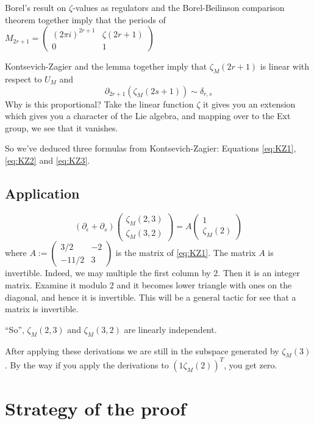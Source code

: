 Borel's result on $\zeta$-values as regulators and the Borel-Beilinson comparison theorem together imply that the periods of $M_{2r+1} = \left( \begin{array}{cc}
(2\pi i)^{2r+1} & \zeta(2r+1) \\
0 & 1
\end{array} \right)$

Kontsevich-Zagier and the lemma together imply that $\zeta_M(2r+1)$ is linear with respect to $U_M$ and
\[\label{eq:KZ3}
\partial_{2r+1}(\zeta_M(2s+1)) \sim \delta_{r,s}
\]
Why is this proportional? Take the linear function $\zeta$ it gives you an extension which gives you a character of the Lie algebra, and mapping over to the Ext group, we see that it vanishes.

So we've deduced three formulas from Kontsevich-Zagier: Equations \ref{eq:KZ1}, \ref{eq:KZ2} and \ref{eq:KZ3}.



\subsection{Application}
\[
(\partial_{\epsilon} + \partial_s)\left( \begin{array}{cc} \zeta_M(2,3) \\ \zeta_M(3,2) \end{array} \right) = A \left( \begin{array}{c} 1 \\ \zeta_M(2) \end{array} \right)
\]
where $A := \left( \begin{array}{cc} 3/2 & -2 \\ -11/2 & 3 \end{array} \right)$ is the matrix of \ref{eq:KZ1}. The matrix $A$ is invertible. Indeed, we may multiple the first column by 2. Then it is an integer matrix. Examine it modulo 2 and it becomes lower triangle with ones on the diagonal, and hence it is invertible. This will be a general tactic for see that a matrix is invertible.

``So'', $\zeta_M(2,3)$ and $\zeta_M(3,2)$ are linearly independent.

After applying these derivations we are still in the subspace generated by $\zeta_M(3)$. By the way if you apply the derivations to $(1 \zeta_M(2))^T$, you get zero.

\section{Strategy of the proof}

